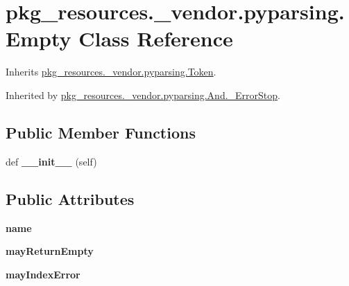 \hypertarget{classpkg__resources_1_1__vendor_1_1pyparsing_1_1_empty}{}\section{pkg\+\_\+resources.\+\_\+vendor.\+pyparsing.\+Empty Class Reference}
\label{classpkg__resources_1_1__vendor_1_1pyparsing_1_1_empty}


Inherits \hyperlink{classpkg__resources_1_1__vendor_1_1pyparsing_1_1_token}{pkg\+\_\+resources.\+\_\+vendor.\+pyparsing.\+Token}.



Inherited by \hyperlink{classpkg__resources_1_1__vendor_1_1pyparsing_1_1_and_1_1___error_stop}{pkg\+\_\+resources.\+\_\+vendor.\+pyparsing.\+And.\+\_\+\+Error\+Stop}.

\subsection*{Public Member Functions}
\begin{DoxyCompactItemize}
\item 
\mbox{\label{classpkg__resources_1_1__vendor_1_1pyparsing_1_1_empty_a3d686c99c26f05ed5af85c7324b570d7}} 
def {\bfseries \+\_\+\+\_\+init\+\_\+\+\_\+} (self)
\end{DoxyCompactItemize}
\subsection*{Public Attributes}
\begin{DoxyCompactItemize}
\item 
\mbox{\label{classpkg__resources_1_1__vendor_1_1pyparsing_1_1_empty_a4bd532ed91e03e2c54746cb9cb8f9566}} 
{\bfseries name}
\item 
\mbox{\label{classpkg__resources_1_1__vendor_1_1pyparsing_1_1_empty_a42abb4486528f19ecf0b5956a12376c6}} 
{\bfseries may\+Return\+Empty}
\item 
\mbox{\label{classpkg__resources_1_1__vendor_1_1pyparsing_1_1_empty_af5269f1102be1d4866db7765843d4b86}} 
{\bfseries may\+Index\+Error}
\end{DoxyCompactItemize}
